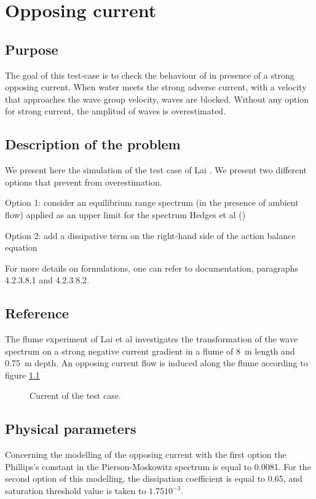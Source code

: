 \chapter{Opposing current}
%

%
\section{Purpose}
%
The goal of this test-case is to check the behaviour of \tomawac in presence of
a strong opposing current. When water meets the strong adverse current, with a
velocity that approaches the wave group velocity, waves are blocked. Without
any option for strong current, the amplitud of waves is overestimated.

%
\section{Description of the problem}
%
We present here the simulation of the test case of Lai \cite{Lai1989}. We
present two different options that prevent from overestimation.

Option 1: consider an equilibrium range spectrum (in the presence of ambient
flow) applied as an upper limit for the spectrum Hedges et al
(\cite{Hedges1985})

Option 2: add a dissipative term on the right-hand side of the action balance
equation \cite{Westhuys2012}

For more details on formulations, one can refer to \tomawac documentation,
paragraphs 4.2.3.8.1 and 4.2.3.8.2.

%
\section{Reference}
%
The flume experiment of Lai et al \cite{Lai1989} investigates the
transformation of the wave spectrum on a strong negative current gradient in a
flume of 8~m length and 0.75~m depth. An opposing current flow is induced
along the flume according to figure \ref{courant}
\begin{figure} [!h]
\centering
{}
 \caption{Current of the test case.}
\label{courant}
\end{figure}

\section{Physical parameters}
Concerning the modelling of the opposing current with the first option the
Phillips’s constant in the Pierson-Moskowitz spectrum is equal to 0.0081.
For the second option of this modelling, the dissipation coefficient is equal
to 0.65, and saturation threshold value is taken to $1.75 10^{-3}$.


